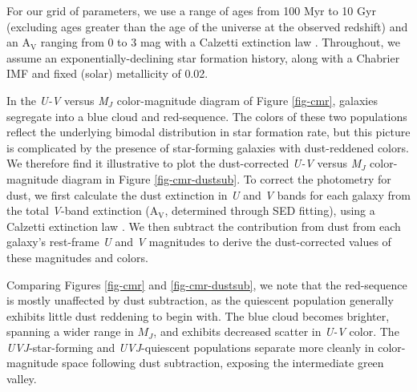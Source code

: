 For our grid of parameters, we use a range of ages from 100 Myr to 10 Gyr (excluding ages greater than the age of the universe at the observed redshift) and an A$_\mathrm{V}$ ranging from 0 to 3 mag with a Calzetti extinction law \citep{Calzetti:2001hh}.
Throughout, we assume an exponentially-declining star formation history, along with a Chabrier IMF \citep{chabrierimf} and fixed (solar) metallicity of 0.02.

In the \textit{U-V} versus \textit{M$_J$} color-magnitude diagram of Figure \ref{fig-cmr}, galaxies segregate into a blue cloud and red-sequence.
The colors of these two populations reflect the underlying bimodal distribution in star formation rate, but this picture is complicated by the presence of star-forming galaxies with dust-reddened colors.
We therefore find it illustrative to plot the dust-corrected \textit{U-V} versus \textit{M$_J$} color-magnitude diagram in Figure \ref{fig-cmr-dustsub}.
To correct the photometry for dust, we first calculate the dust extinction in \textit{U} and \textit{V} bands for each galaxy from the total \textit{V}-band extinction (A$_\mathrm{V}$, determined through SED fitting), using a Calzetti extinction law \citep{Calzetti:2001hh}.
We then subtract the contribution from dust from each galaxy's rest-frame \textit{U} and \textit{V} magnitudes to derive the dust-corrected values of these magnitudes and colors.

Comparing Figures \ref{fig-cmr} and \ref{fig-cmr-dustsub}, we note that the red-sequence is mostly unaffected by dust subtraction, as the quiescent population generally exhibits little dust reddening to begin with.
The blue cloud becomes brighter, spanning a wider range in $M_J$, and exhibits decreased scatter in \textit{U-V} color.
The \textit{UVJ}-star-forming and \textit{UVJ}-quiescent populations separate more cleanly in color-magnitude space following dust subtraction, exposing the intermediate green valley.


